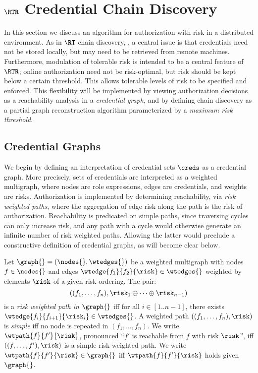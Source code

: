 \section{$\RTR$ Credential Chain Discovery}
\label{section-chain-discovery}

In this section we discuss an algorithm for authorization with risk in a
distributed environment.  As in $\RT$ chain discovery,
\cite{Li:2003-02}, a central issue is that credentials need not
be stored locally, but may need to be retrieved from remote machines.
Furthermore, modulation of tolerable risk is intended to be a central
feature of $\RTR$; online authorization need not be risk-optimal, but
risk should be kept below a certain threshold.  This allows tolerable
levels of risk to be specified and enforced.  This flexibility will be
implemented by viewing authorization decisions as a reachability
analysis in a \emph{credential graph}, and by defining chain discovery
as a partial graph reconstruction algorithm parameterized by 
a \emph{maximum risk threshold}.

\subsection{Credential Graphs}

We begin by defining an interpretation of credential sets $\creds$ as
a credential graph.  More precisely, sets of credentials are
interpreted as a weighted multigraph, where nodes are role
expressions, edges are credentials, and weights are risks.
Authorization is implemented by determining reachability, via
\emph{risk weighted paths}, where the aggregation of edge risk along
the path is the risk of authorization.  Reachability is predicated on
simple paths, since traversing cycles can only increase risk, and any
path with a cycle would otherwise generate an infinite number of risk
weighted paths.  Allowing the latter would preclude a constructive 
definition of credential graphs, as will become clear below.
\begin{definition}
Let $\graph{} = (\nodes{}, \wtedges{})$ be a weighted multigraph with
nodes $f \in \nodes{}$ and edges $\wtedge{f_1}{f_2}{\risk} \in
\wtedges{}$ weighted by elements $\risk$ of a given risk ordering.
The pair:
$$((f_1,\ldots,f_n), \risk_1 \oplus \cdots \oplus \risk_{n-1})$$ is a
\emph{risk weighted path in $\graph{}$} iff for all $i \in [1..n-1]$,
there exists $\wtedge{f_i}{f_{i+1}}{\risk_i} \in \wtedges{}$.  A
weighted path $((f_1,\ldots,f_n), \risk)$ is \emph{simple} iff no node
is repeated in $(f_1,\ldots,f_n)$.  We write $\wtpath{f}{f'}{\risk}$,
pronounced ``$f'$ is reachable from $f$ with risk $\risk$'',
iff $((f,\ldots,f'), \risk)$ is a simple risk weighted path.  We
write $\wtpath{f}{f'}{\risk} \in \graph{}$ iff $\wtpath{f}{f'}{\risk}$
holds given $\graph{}$.
\end{definition}

